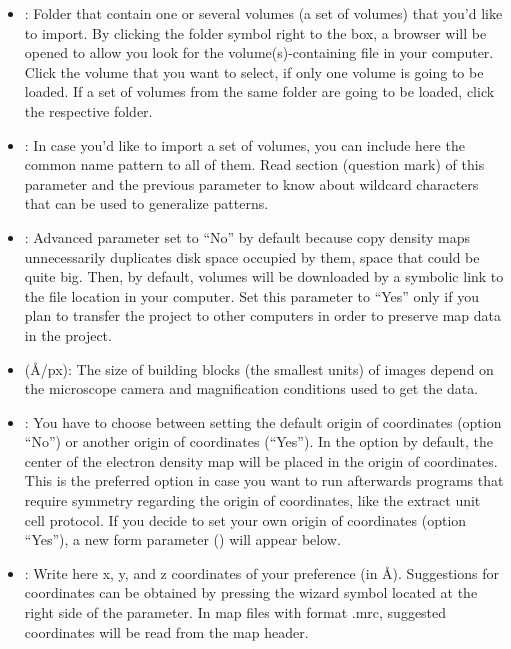 \begin{itemize}
\begin{itemize}
  \begin{itemize}
   \item {}: Folder that contain one or several volumes (a set of volumes) that you'd like to import. By clicking the folder symbol right to the  box, a browser will be opened to allow you look for the volume(s)-containing file in your computer. Click the volume that you want to select, if only one volume is going to be loaded. If a set of volumes from the same folder are going to be loaded, click the respective folder.
   \item {}: In case you'd like to import a set of volumes, you can include here the common name pattern to all of them. Read  section (question mark) of this parameter and the previous parameter  to know about wildcard characters that can be used to generalize patterns.
   \item {}: Advanced parameter set to ``No'' by default because copy density maps unnecessarily duplicates disk space occupied by them, space that could be quite big. Then, by default, volumes will be downloaded by a symbolic link to the file location in your computer. Set this parameter to ``Yes'' only if you plan to transfer the project to other computers in order to preserve map data in the \scipion project.
   \item {} (\AA/px): The size of building blocks (the smallest units) of images depend on the microscope camera and magnification conditions used to get the data.
   \item {}: You have to choose between setting the default origin of coordinates (option ``No'') or another origin of coordinates (``Yes''). In the option by default, the center of the electron density map will be placed in the origin of coordinates. This is the preferred option in case you want to run afterwards programs that require symmetry regarding the origin of coordinates, like the extract unit cell protocol. If you decide to set your own origin of coordinates (option ``Yes''), a new form parameter () will appear below.
   \item {}: Write here x, y, and z coordinates of your preference (in \AA). Suggestions for coordinates can be obtained by pressing the wizard symbol located at the right side of the  parameter. In map files with format .mrc, suggested coordinates will be read from the map header.
   \end{itemize}
   

\end{itemize}
\end{itemize}
